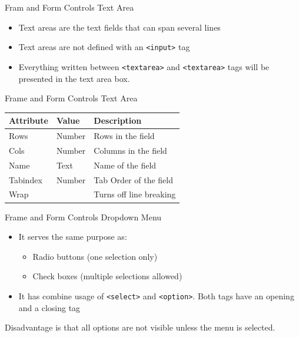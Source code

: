 \documentclass[14pt]{beamer}
\begin{document}
\begin{frame}{Fram and Form Controls}
Text Area
\begin{itemize}
 \item Text areas are the text fields that can span several lines
 \item Text areas are not defined with an \lstinline!<input>! tag
 \item Everything written between \lstinline!<textarea>! and \lstinline!<textarea>! tags will be presented in the text area box.
\end{itemize}
\end{frame}

\begin{frame}{Frame and Form Controls}
Text Area

\vspace{1pc}
\begin{tabular}{|p{2.5cm} | p{2cm} | p{4cm} |}
 \hline
 \textbf{Attribute} & \textbf{Value} & \textbf{Description} \\ \hline
 Rows & Number & Rows in the field \\ \hline
 Cols & Number & Columns in the field \\ \hline
 Name & Text & Name of the field \\ \hline
 Tabindex & Number & Tab Order of the field \\ \hline
 Wrap & & Turns off line breaking  \\ \hline
 \end{tabular}
\end{frame}

\begin{frame}{Frame and Form Controls}
Dropdown Menu

\vspace{.5pc}
\begin{itemize}
 \item It serves the same purpose as:
 \begin{itemize}
 \item Radio buttons (one selection only)
 \item Check boxes (multiple selections allowed)
 \end{itemize}
 \item It has combine  usage of \lstinline!<select>! and \lstinline!<option>!. Both tags have an opening and a closing tag
 \end{itemize}
Disadvantage is that all options are not visible unless the menu is selected.
\end{frame}
\end{document}

